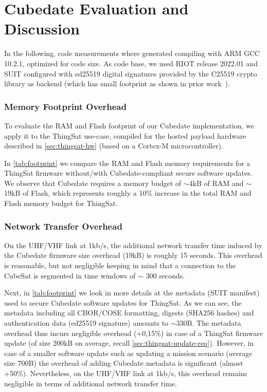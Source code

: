 \section{Cubedate Evaluation and Discussion}
\label{sec:evaluation}



In the following, code measurements where generated compiling with ARM GCC 10.2.1,
optimized for code size. As code base, we used RIOT release 2022.01 and SUIT configured with ed25519 digital signatures provided by the C25519 crypto library as backend (which has small footprint as shown in prior work~\cite{zandberg2019secure}).

\subsubsection{Memory Footprint Overhead}

To evaluate the RAM and Flash footprint of our Cubedate implementation, we apply it to the ThingSat use-case, compiled for the hosted payload hardware described in \autoref{sec:thingsat-hw} (based on a Cortex-M microcontroller).

In \autoref{tab:footprint} we compare the RAM and Flash memory requirements for a ThingSat firmware without/with Cubedate-compliant secure software updates.
We observe that Cubedate requires a memory budget of $\sim$4kB of RAM and $\sim$19kB of Flash, which represents roughly a 10\% increase in the total RAM and Flash memory budget for ThingSat.

\subsubsection{Network Transfer Overhead}
On the UHF/VHF link at 1kb/s, the additional network transfer time induced by the Cubedate firmware size overhead (19kB) is roughly 15 seconds. This overhead is reasonable, but not negligible keeping in mind that a connection to the CubeSat is segmented in time windows of $\sim$ 300 seconds.

Next, in \autoref{tab:footprint} we look in more details at the metadata (SUIT manifest) used to secure Cubedate software updates for ThingSat.
As we can see, the metadata including all CBOR/COSE formatting, digests (SHA256 hashes) and authentication data (ed25519 signature) amounts to $\sim$330B. The metadata overhead thus incurs negligible overhead (+0,15\%) in case of a ThingSat firmware update (of size 200kB on average, recall \autoref{sec:thingsat-update-req}). However, in case of a smaller software update such as updating a mission scenario (average size 700B) the overhead of adding Cubedate metadata is significant (almost +50\%).
Nevertheless, on the UHF/VHF link at 1kb/s, this overhead remains negligible in terms of additional network transfer time.

